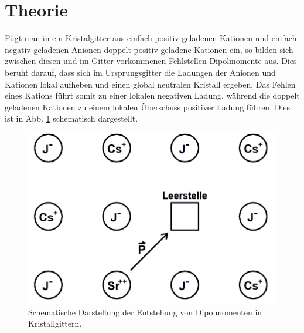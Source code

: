 \section{Theorie}
\label{sec:Theorie}

Fügt man in ein Kristalgitter aus einfach positiv geladenen Kationen und einfach negativ geladenen Anionen doppelt positiv geladene Kationen ein, so bilden sich zwischen diesen und im Gitter vorkommenen Fehlstellen Dipolmomente aus. Dies beruht darauf, dass sich im Ursprungsgitter die Ladungen der Anionen und Kationen lokal aufheben und einen global neutralen Kristall ergeben. Das Fehlen eines Kations führt somit zu einer lokalen negativen Ladung, während die doppelt geladenen Kationen zu einem lokalen Überschuss positiver Ladung führen. Dies ist in Abb. \ref{fig:fehlstelle} schematisch dargestellt.

\begin{figure}
  \centering
  \includegraphics{./logos/Fehlstelle.PNG}
  \caption{Schematische Darstellung der Entstehung von Dipolmomenten in Kristallgittern.\cite{Anleitung}}
  \label{fig:fehlstelle}
\end{figure}

